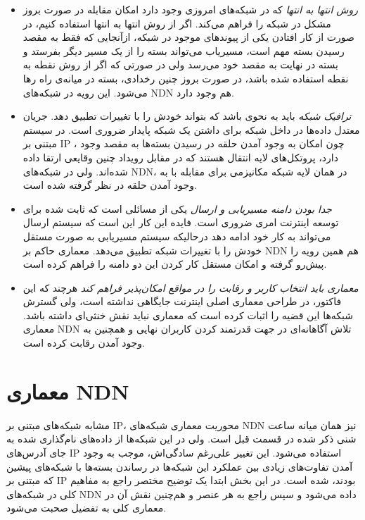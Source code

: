 \begin{itemize}
{}

\item{
\textit{روش انتها به انتها}
 \cite{end2end}
 که در شبکه‌های امروزی وجود دارد امکان مقابله در صورت بروز مشکل در شبکه  را فراهم می‌کند. اگر از روش انتها به انتها استفاده کنیم، در صورت از کار افتادن یکی از پیوندهای موجود در شبکه، از‌آنجایی که فقط به مقصد رسیدن بسته مهم است، مسیریاب می‌تواند بسته را از یک مسیر دیگر بفرستد و بسته در نهایت به مقصد خود می‌رسد ولی در صورتی که اگر از روش نقطه به نقطه استفاده شده باشد، در صورت بروز چنین رخدادی، بسته در میانه‌ی راه رها می‌شود. این رویه در شبکه‌های NDN هم وجود دارد. 
}

\item{
\textit{ترافیک شبکه}
باید به نحوی باشد که بتواند خودش را با تغییرات تطبیق دهد. جریان معتدل داده‌ها در داخل شبکه برای داشتن یک شبکه پایدار ضروری است. در سیستم مبتنی بر IP ، چون امکان به وجود آمدن حلقه در رسیدن بسته‌ها به مقصد وجود دارد، پروتکل‌های لایه انتقال هستند که در مقابل رویداد چنین وقایعی ارتقا داده شده‌اند. ولی در شبکه‌‌های NDN، در همان لایه شبکه مکانیزمی برای مقابله با به وجود آمدن حلقه در نظر گرفته شده است. 
}
\item{
\textit{جدا بودن دامنه مسیریابی و ارسال}
یکی از مسائلی است که ثابت شده برای توسعه اینترنت امری ضروری است. فایده این کار این است که سیستم ارسال می‌تواند به کار خود ادامه دهد درحالیکه سیستم مسیریابی به صورت مستقل خودش را با تغییرات شبکه تطبیق می‌دهد.  معماری حاکم بر NDN هم همین رویه را پیش‌رو گرفته و امکان مستقل کار کردن این دو دامنه را فراهم کرده است. 
}

\item{
\textit{ معماری باید انتخاب کاربر و رقابت را در مواقع امکان‌پذیر فراهم کند }
هرچند که این فاکتور، در طراحی معماری اصلی اینترنت جایگاهی نداشته است، ولی گسترش شبکه‌ها این قضیه را اثبات کرده است که معماری نباید نقش خنثی‌ای داشته باشد. معماری NDN تلاش آگاهانه‌ای در جهت قدرتمند کردن کاربران نهایی و همچنین به وجود آمدن رقابت کرده است. 
}

\end{itemize}

\section{معماری NDN}
مشابه شبکه‌های مبتنی بر IP، محوریت معماری شبکه‌های NDN  نیز همان میانه ساعت شنی ذکر شده در قسمت قبل است. ولی در این شبکه‌ها از داده‌‌های نام‌گذاری شده به جای آدرس‌های IP استفاده می‌‌شود. این تغییر علی‌رغم سادگی‌اش، موجب به وجود آمدن تفاوت‌های زیادی بین عملکرد این شبکه‌ها در رساندن بسته‌ها با شبکه‌های پیشین که مبتنی بر IP بودند، شده است.  در این بخش ابتدا یک توضیح مختصر راجع به مفاهیم کلی در شبکه‌های NDN داده می‌شود و سپس راجع به هر عنصر و هم‌چنین نقش آن در معماری کلی به تفضیل صحبت می‌شود. 

